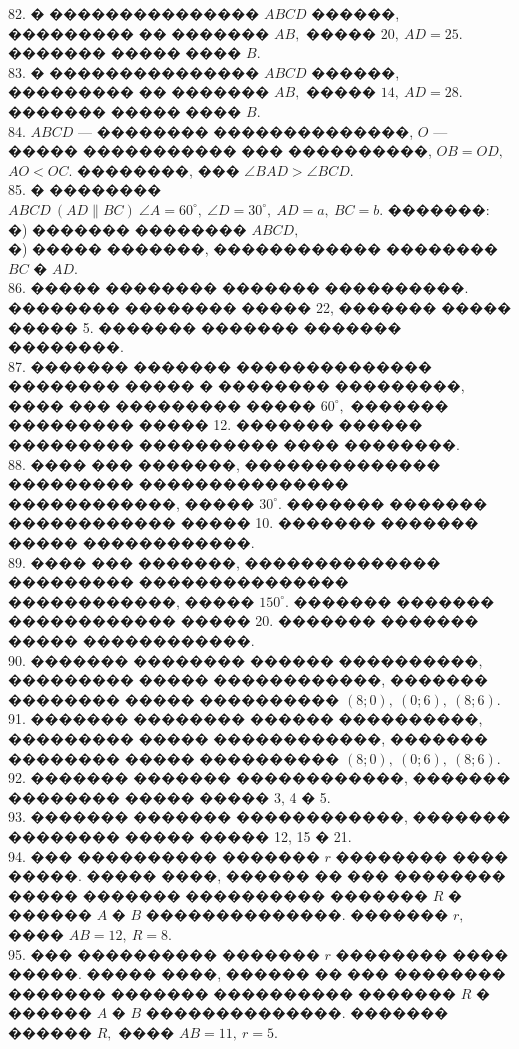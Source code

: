 \documentclass[12pt]{article}
\begin{document}
82. � ��������������� $ABCD$ ������, ��������� �� ������� $AB,$ ����� $20,\ AD=25.$ ������� ����� ���� $B.$\\
83. � ��������������� $ABCD$ ������, ��������� �� ������� $AB,$ ����� $14,\ AD=28.$ ������� ����� ���� $B.$\\
84. $ABCD$ --- �������� ��������������, $O$ --- ����� ����������� ��� ����������, $OB=OD,$\\$AO<OC.$ ��������, ��� $\angle BAD>\angle BCD.$\\
85. � �������� $ABCD\ (AD\parallel BC)\ \angle A=60^\circ,\ \angle D=30^\circ,\ AD=a,\ BC=b.$ �������:\\
�) ������� �������� $ABCD,$\\
�) ����� �������, ������������ �������� $BC$ � $AD.$\\
86. ����� �������� ������� ����������. �������� �������� ����� 22, ������� ����� ����� 5. ������� ������� ������� ��������.\\
87. ������� ������� �������������� �������� ����� � �������� ���������, ���� ��� ��������� ����� $60^\circ,$ ������� ��������� ����� 12. ������� ������ ��������� ���������� ���� ��������.\\
88. ���� ��� �������, �������������� ��������� ��������������� ������������, ����� $30^\circ.$ ������� ������� ������������ ����� 10. ������� ������� ����� ������������.\\
89. ���� ��� �������, �������������� ��������� ��������������� ������������, ����� $150^\circ.$ ������� ������� ������������ ����� 20. ������� ������� ����� ������������.\\
90. ������� �������� ������ ����������, ��������� ����� ������������, ������� �������� ����� ���������� $(8;0),\ (0;6),\ (8;6).$\\
91. ������� �������� ������ ����������, ��������� ����� ������������, ������� �������� ����� ���������� $(8;0),\ (0;6),\ (8;6).$\\
92. ������� ������� ������������, ������� �������� ����� ����� 3, 4 � 5.\\
93. ������� ������� ������������, ������� �������� ����� ����� 12, 15 � 21.\\
94. ��� ���������� ������� $r$ �������� ���� �����. ����� ����, ������ �� ��� �������� ����� ������� ���������� ������� $R$ � ������ $A$ � $B$ ��������������. �������  $r,$ ���� $AB=12,\ R=8.$\\
95. ��� ���������� ������� $r$ �������� ���� �����. ����� ����, ������ �� ��� �������� ������� ������� ���������� ������� $R$ � ������ $A$ � $B$ ��������������. ������� ������ $R,$ ���� $AB=11,\ r=5.$\\
\end{document}
